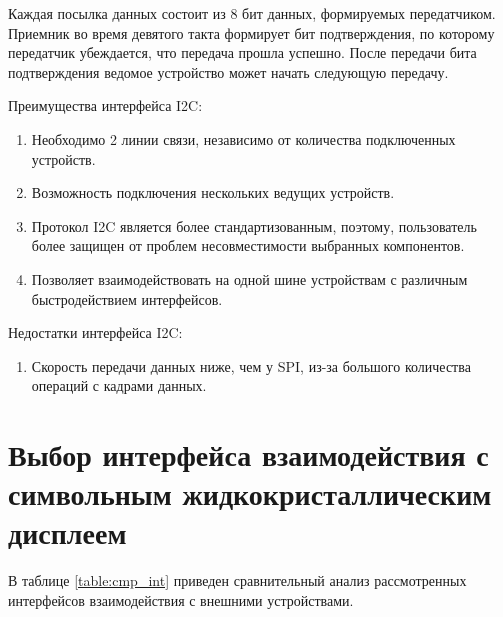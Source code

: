 Каждая посылка данных состоит из 8 бит данных, формируемых передатчиком. Приемник во время девятого такта формирует бит подтверждения, по которому передатчик убеждается, что передача прошла успешно. После передачи бита подтверждения ведомое устройство может начать следующую передачу.

Преимущества интерфейса I2C:
\begin{enumerate}
	\item Необходимо 2 линии связи, независимо от количества подключенных устройств.
	\item Возможность подключения нескольких ведущих устройств.
	\item Протокол I2C является более стандартизованным, поэтому, пользователь более защищен от проблем несовместимости выбранных компонентов.
	\item Позволяет взаимодействовать на одной шине устройствам с различным быстродействием интерфейсов.
\end{enumerate}

Недостатки интерфейса I2C:
\begin{enumerate}
	\item Скорость передачи данных ниже, чем у SPI, из-за большого количества операций с кадрами данных.
\end{enumerate}

\section{Выбор интерфейса взаимодействия с символьным жидкокристаллическим дисплеем}

В таблице \ref{table:cmp_int} приведен сравнительный анализ рассмотренных интерфейсов взаимодействия с внешними устройствами.

